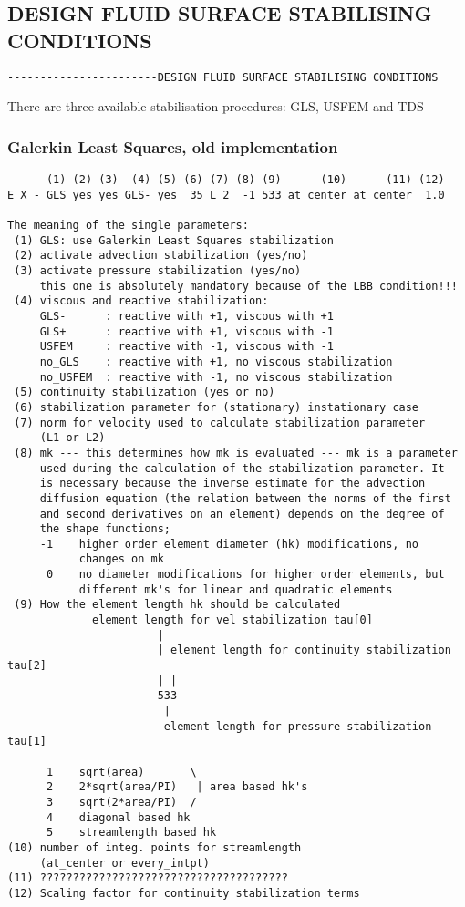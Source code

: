 \subsection{DESIGN FLUID SURFACE STABILISING CONDITIONS}
\begin{verbatim}
-----------------------DESIGN FLUID SURFACE STABILISING CONDITIONS
\end{verbatim}

There are three available stabilisation procedures: GLS, USFEM and TDS
\subsubsection{Galerkin Least Squares, old implementation}
\begin{verbatim}
      (1) (2) (3)  (4) (5) (6) (7) (8) (9)      (10)      (11) (12)
E X - GLS yes yes GLS- yes  35 L_2  -1 533 at_center at_center  1.0

The meaning of the single parameters:
 (1) GLS: use Galerkin Least Squares stabilization
 (2) activate advection stabilization (yes/no)
 (3) activate pressure stabilization (yes/no)
     this one is absolutely mandatory because of the LBB condition!!!
 (4) viscous and reactive stabilization: 
     GLS-      : reactive with +1, viscous with +1
     GLS+      : reactive with +1, viscous with -1
     USFEM     : reactive with -1, viscous with -1
     no_GLS    : reactive with +1, no viscous stabilization
     no_USFEM  : reactive with -1, no viscous stabilization
 (5) continuity stabilization (yes or no)
 (6) stabilization parameter for (stationary) instationary case
 (7) norm for velocity used to calculate stabilization parameter
     (L1 or L2)
 (8) mk --- this determines how mk is evaluated --- mk is a parameter
     used during the calculation of the stabilization parameter. It
     is necessary because the inverse estimate for the advection
     diffusion equation (the relation between the norms of the first 
     and second derivatives on an element) depends on the degree of
     the shape functions;
     -1    higher order element diameter (hk) modifications, no 
           changes on mk
      0    no diameter modifications for higher order elements, but
           different mk's for linear and quadratic elements
 (9) How the element length hk should be calculated
             element length for vel stabilization tau[0]
                       |
                       | element length for continuity stabilization tau[2]
                       | |
                       533
                        |
                        element length for pressure stabilization tau[1]

      1    sqrt(area)       \
      2    2*sqrt(area/PI)   | area based hk's
      3    sqrt(2*area/PI)  /
      4    diagonal based hk
      5    streamlength based hk
(10) number of integ. points for streamlength 
     (at_center or every_intpt)
(11) ??????????????????????????????????????
(12) Scaling factor for continuity stabilization terms
\end{verbatim}
